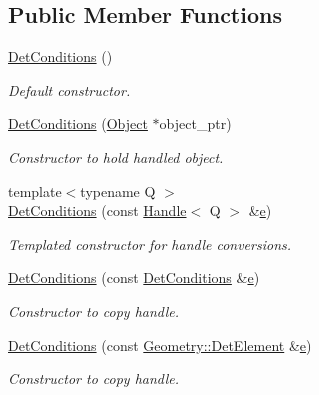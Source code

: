 \subsection*{Public Member Functions}
\begin{DoxyCompactItemize}
\item 
\hyperlink{class_d_d4hep_1_1_conditions_1_1_det_conditions_a9a4cde83aa738c3970fd1cfe2e77f3b0}{Det\+Conditions} ()
\begin{DoxyCompactList}\small\item\em Default constructor. \end{DoxyCompactList}\item 
\hyperlink{class_d_d4hep_1_1_conditions_1_1_det_conditions_a54b5cab9b9fca16db159c7f2cf5a4023}{Det\+Conditions} (\hyperlink{class_d_d4hep_1_1_conditions_1_1_det_conditions_a4c0ad456b1967b5b724894f23ef63dec}{Object} $\ast$object\+\_\+ptr)
\begin{DoxyCompactList}\small\item\em Constructor to hold handled object. \end{DoxyCompactList}\item 
{\footnotesize template$<$typename Q $>$ }\\\hyperlink{class_d_d4hep_1_1_conditions_1_1_det_conditions_a7d12ebc96b11700bf8034303e58224ae}{Det\+Conditions} (const \hyperlink{class_d_d4hep_1_1_handle}{Handle}$<$ Q $>$ \&\hyperlink{_volumes_8cpp_a8a9a1f93e9b09afccaec215310e64142}{e})
\begin{DoxyCompactList}\small\item\em Templated constructor for handle conversions. \end{DoxyCompactList}\item 
\hyperlink{class_d_d4hep_1_1_conditions_1_1_det_conditions_a5b72efafc068b87b3ec6eba550353afe}{Det\+Conditions} (const \hyperlink{class_d_d4hep_1_1_conditions_1_1_det_conditions}{Det\+Conditions} \&\hyperlink{_volumes_8cpp_a8a9a1f93e9b09afccaec215310e64142}{e})
\begin{DoxyCompactList}\small\item\em Constructor to copy handle. \end{DoxyCompactList}\item 
\hyperlink{class_d_d4hep_1_1_conditions_1_1_det_conditions_a48f5f45b8d7896721e3875f0b02e0f9a}{Det\+Conditions} (const \hyperlink{class_d_d4hep_1_1_geometry_1_1_det_element}{Geometry\+::\+Det\+Element} \&\hyperlink{_volumes_8cpp_a8a9a1f93e9b09afccaec215310e64142}{e})
\begin{DoxyCompactList}\small\item\em Constructor to copy handle. \end{DoxyCompactList}\item 

\end{DoxyCompactItemize}
